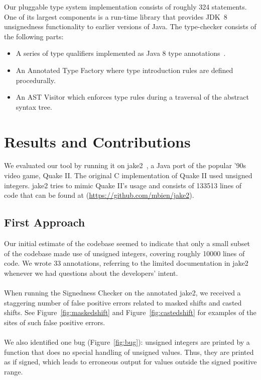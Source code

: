 Our pluggable type system implementation consists of roughly 324 statements.
One of its largest components is a run-time library that provides
JDK~8 unsignedness functionality to earlier versions of Java.  The
type-checker consists of the following parts:

\begin{itemize}
  \item A series of type qualifiers implemented as Java 8 type
    annotations~\cite{JSR308-PFD}.
  \item An Annotated Type Factory where type introduction rules are defined procedurally.
  \item An AST Visitor which enforces type rules during a traversal of the
  abstract syntax tree.
\end{itemize}

\newpage
\section{Results and Contributions} \label{results}
We evaluated our tool by running it on jake2~\cite{Jake2}, a Java
port of the popular '90s video game, Quake II\@.  The original C
implementation of Quake II used unsigned integers. jake2
tries to mimic Quake II's usage and consists of 133513 lines of code that
can be found at (\url{https://github.com/mbien/jake2}).

\subsection{First Approach} \label{partial}
Our initial estimate of the codebase seemed to indicate that only a small
subset of the codebase made use of unsigned integers, covering roughly
10000 lines of code. We wrote 33 annotations, referring to the limited
documentation in jake2 whenever we had questions about the developers'
intent.\\
\\
When running the Signedness Checker on the annotated jake2, we received
a staggering number of false positive errors related to masked shifts and
casted shifts. See Figure~\ref{fig:maskedshift} and Figure~\ref{fig:castedshift}
for examples of the sites of such false positive errors.\\
\\
We also identified one bug (Figure~\ref{fig:bug}):
unsigned integers are printed by a function that does no special handling
of unsigned values.  Thus, they are printed as
if signed, which leads to erroneous output for values outside the signed
positive range.

